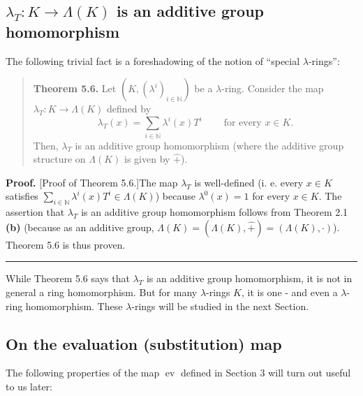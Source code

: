 \documentclass[numbers=enddot,12pt,final,onecolumn,notitlepage]{scrartcl}%
\newenvironment{proof}[1][Proof]{\noindent\textbf{#1.} }{\ \rule{0.5em}{0.5em}}
\begin{document}
\subsection{$\lambda_{T}:K\rightarrow\Lambda\left(  K\right)  $ is an additive
group homomorphism}

The following trivial fact is a foreshadowing of the notion of ``special
$\lambda$-rings'':

\begin{quote}
\textbf{Theorem 5.6.} Let $\left(  K,\left(  \lambda^{i}\right)
_{i\in\mathbb{N}}\right)  $ be a $\lambda$-ring. Consider the map $\lambda
_{T}:K\rightarrow\Lambda\left(  K\right)  $ defined by
\[
\lambda_{T}\left(  x\right)  =\sum\limits_{i\in\mathbb{N}}\lambda^{i}\left(
x\right)  T^{i}\ \ \ \ \ \ \ \ \ \ \text{for every }x\in K.
\]
Then, $\lambda_{T}$ is an additive group homomorphism (where the additive
group structure on $\Lambda\left(  K\right)  $ is given by $\widehat{+}$).
\end{quote}

\begin{proof}
[Proof of Theorem 5.6.]The map $\lambda_{T}$ is well-defined (i. e. every
$x\in K$ satisfies $\sum\limits_{i\in\mathbb{N}}\lambda^{i}\left(  x\right)
T^{i}\in\Lambda\left(  K\right)  $) because $\lambda^{0}\left(  x\right)  =1$
for every $x\in K$. The assertion that $\lambda_{T}$ is an additive group
homomorphism follows from Theorem 2.1 \textbf{(b)} (because as an additive
group, $\Lambda\left(  K\right)  =\left(  \Lambda\left(  K\right)
,\widehat{+}\right)  =\left(  \Lambda\left(  K\right)  ,\cdot\right)  $).
Theorem 5.6 is thus proven.
\end{proof}

While Theorem 5.6 says that $\lambda_{T}$ is an additive group homomorphism,
it is not in general a ring homomorphism. But for many $\lambda$-rings $K$, it
is one - and even a $\lambda$-ring homomorphism. These $\lambda$-rings will be
studied in the next Section.

\subsection{On the evaluation (substitution) map}

The following properties of the map $\operatorname*{ev}$ defined in Section 3
will turn out useful to us later:
\end{document}
